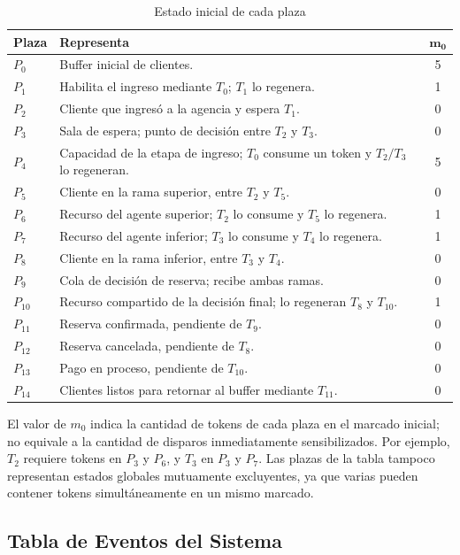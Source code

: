 \documentclass[11pt,a4paper]{article}
\begin{document}
\begin{table}[H]
\centering
\caption{Estado inicial de cada plaza}
\small
\begin{tabularx}{\textwidth}{@{} l X c @{}}
\toprule
\textbf{Plaza} & \textbf{Representa} & $\boldsymbol{m_0}$ \\ \midrule
$P_0$ & Buffer inicial de clientes. & 5 \\
$P_1$ & Habilita el ingreso mediante $T_0$; $T_1$ lo regenera. & 1 \\
$P_2$ & Cliente que ingresó a la agencia y espera $T_1$. & 0 \\
$P_3$ & Sala de espera; punto de decisión entre $T_2$ y $T_3$. & 0 \\
$P_4$ & Capacidad de la etapa de ingreso; $T_0$ consume un token y $T_2/T_3$ lo regeneran. & 5 \\
$P_5$ & Cliente en la rama superior, entre $T_2$ y $T_5$. & 0 \\
$P_6$ & Recurso del agente superior; $T_2$ lo consume y $T_5$ lo regenera. & 1 \\
$P_7$ & Recurso del agente inferior; $T_3$ lo consume y $T_4$ lo regenera. & 1 \\
$P_8$ & Cliente en la rama inferior, entre $T_3$ y $T_4$. & 0 \\
$P_9$ & Cola de decisión de reserva; recibe ambas ramas. & 0 \\
$P_{10}$ & Recurso compartido de la decisión final; lo regeneran $T_8$ y $T_{10}$. & 1 \\
$P_{11}$ & Reserva confirmada, pendiente de $T_9$. & 0 \\
$P_{12}$ & Reserva cancelada, pendiente de $T_8$. & 0 \\
$P_{13}$ & Pago en proceso, pendiente de $T_{10}$. & 0 \\
$P_{14}$ & Clientes listos para retornar al buffer mediante $T_{11}$. & 0 \\ \bottomrule
\end{tabularx}
\end{table}

El valor de $m_0$ indica la cantidad de tokens de cada plaza en el marcado
inicial; no equivale a la cantidad de disparos inmediatamente sensibilizados.
Por ejemplo, $T_2$ requiere tokens en $P_3$ y $P_6$, y $T_3$ en $P_3$ y $P_7$.
Las plazas de la tabla tampoco representan estados globales mutuamente
excluyentes, ya que varias pueden contener tokens simultáneamente en un mismo
marcado.

\subsection{Tabla de Eventos del Sistema}
\end{document}
